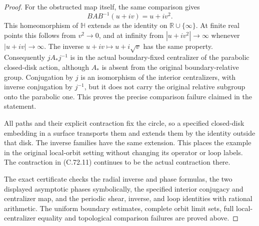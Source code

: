 \begin{proof}
For the obstructed map itself, the same
comparison gives
\[
                     BAB^{-1}(u+iv)=u+i v^2 .
                                                               \tag{C.72.17}
\]
This homeomorphism of $\mathbb H$ extends as
the identity on $\mathbb R\cup\{\infty\}$.
At finite real points this follows from
$v^2\to0$, and at infinity from
$|u+i v^2|\to\infty$ whenever
$|u+iv|\to\infty$. The inverse
$u+iv\mapsto u+i\sqrt v$ has the same property.
Consequently $jA_*j^{-1}$ is in the actual
boundary-fixed centralizer of the parabolic
closed-disk action, although $A_*$ is absent
from the original boundary-relative group.
Conjugation by $j$ is an isomorphism of the
interior centralizers, with inverse conjugation
by $j^{-1}$, but it does not carry the original
relative subgroup onto the parabolic one.
This proves the precise comparison failure
claimed in the statement.

All paths and their explicit contraction fix
the circle, so a specified closed-disk embedding
in a surface transports them and extends them
by the identity outside that disk. The inverse
families have the same extension. This places
the example in the original local-orbit setting
without changing its operator or loop labels.
The contraction in (C.72.11) continues to be
the actual contraction there.

The exact certificate
checks the radial inverse and phase formulas,
the two displayed asymptotic phases symbolically,
the specified interior conjugacy and centralizer
map, and the periodic shear, inverse, and loop
identities with rational arithmetic.
The uniform boundary estimates, complete orbit
limit sets, full local-centralizer equality and
topological comparison failures are proved above.
\end{proof}
